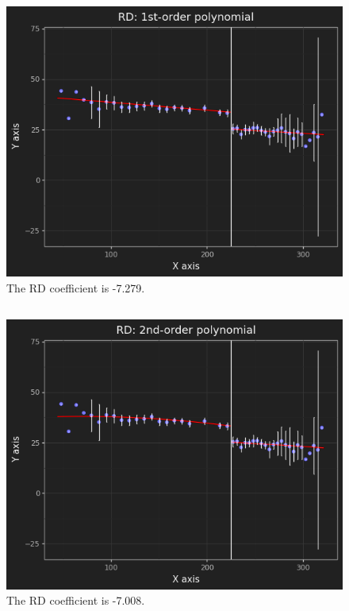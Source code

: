 \documentclass{article}
\begin{document}
\subsection{}
\begin{figure}[!h]
    \centering
    \includegraphics[scale=.9]{homework6/output/rdplot1.png}
    \caption{The RD coefficient is -7.279.}
    \label{fig:figure2}
\end{figure}


\clearpage

\subsection{}
\begin{figure}[!h]
    \centering
    \includegraphics[scale=.9]{homework6/output/rdplot2.png}
    \caption{The RD coefficient is -7.008.}
    \label{fig:figure3}
\end{figure}
\end{document}
